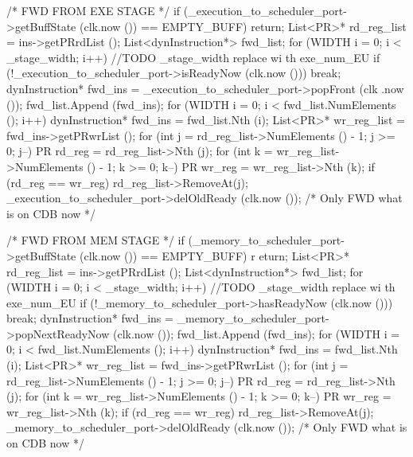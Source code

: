 \begin{DoxyCode}
                                                                     {
    { /* FWD FROM EXE STAGE */
        if (_execution_to_scheduler_port->getBuffState (clk.now ()) == 
      EMPTY_BUFF) return;
        List<PR>* rd_reg_list = ins->getPRrdList ();
        List<dynInstruction*> fwd_list;
        for (WIDTH i = 0; i < _stage_width; i++) { //TODO _stage_width replace wi
      th exe_num_EU
            if (!_execution_to_scheduler_port->isReadyNow (clk.now ())) break;
            dynInstruction* fwd_ins = _execution_to_scheduler_port->popFront (clk
      .now ());
            fwd_list.Append (fwd_ins);
        }
        for (WIDTH i = 0; i < fwd_list.NumElements (); i++) {
            dynInstruction* fwd_ins = fwd_list.Nth (i);
            List<PR>* wr_reg_list = fwd_ins->getPRwrList ();
            for (int j = rd_reg_list->NumElements () - 1; j >= 0; j--) {
                PR rd_reg = rd_reg_list->Nth (j);
                for (int k = wr_reg_list->NumElements () - 1; k >= 0; k--) {
                    PR wr_reg = wr_reg_list->Nth (k);
                    if (rd_reg == wr_reg) {
                        rd_reg_list->RemoveAt(j);
                    }
                }
            }
        }
        _execution_to_scheduler_port->delOldReady (clk.now ()); /* Only FWD what 
      is on CDB now */
    }

    { /* FWD FROM MEM STAGE */
        if (_memory_to_scheduler_port->getBuffState (clk.now ()) == EMPTY_BUFF) r
      eturn;
        List<PR>* rd_reg_list = ins->getPRrdList ();
        List<dynInstruction*> fwd_list;
        for (WIDTH i = 0; i < _stage_width; i++) { //TODO _stage_width replace wi
      th exe_num_EU
            if (!_memory_to_scheduler_port->hasReadyNow (clk.now ())) break;
            dynInstruction* fwd_ins = _memory_to_scheduler_port->popNextReadyNow 
      (clk.now ());
            fwd_list.Append (fwd_ins);
        }
        for (WIDTH i = 0; i < fwd_list.NumElements (); i++) {
            dynInstruction* fwd_ins = fwd_list.Nth (i);
            List<PR>* wr_reg_list = fwd_ins->getPRwrList ();
            for (int j = rd_reg_list->NumElements () - 1; j >= 0; j--) {
                PR rd_reg = rd_reg_list->Nth (j);
                for (int k = wr_reg_list->NumElements () - 1; k >= 0; k--) {
                    PR wr_reg = wr_reg_list->Nth (k);
                    if (rd_reg == wr_reg) {
                        rd_reg_list->RemoveAt(j);
                    }
                }
            }
        }
        _memory_to_scheduler_port->delOldReady (clk.now ()); /* Only FWD what is 
      on CDB now */
    }
}
\end{DoxyCode}
